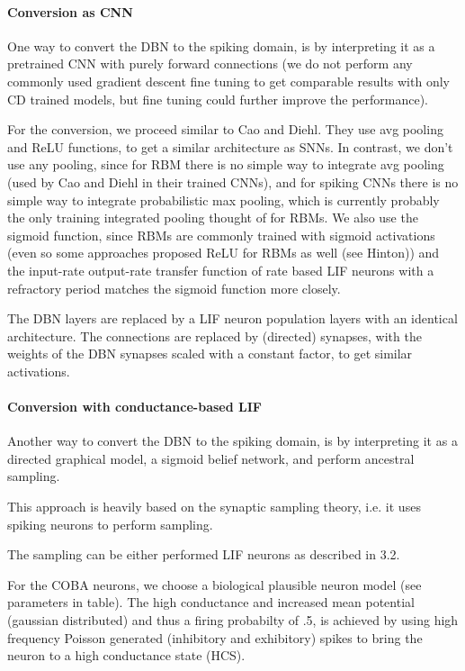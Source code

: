 \paragraph{Conversion as CNN} 

One way to convert the DBN to the spiking domain, is by interpreting it as a pretrained CNN with purely forward connections (we do not perform any commonly used gradient descent fine tuning to get comparable results with only CD trained models, but fine tuning could further improve the performance).

For the conversion, we proceed similar to Cao and Diehl.
They use avg pooling and ReLU functions, to get a similar architecture as SNNs.
In contrast, we don't use any pooling, since for RBM there is no simple way to integrate avg pooling (used by Cao and Diehl in their trained CNNs), and for spiking CNNs there is no simple way to integrate probabilistic max pooling, which is currently probably the only training integrated pooling thought of for RBMs.
We also use the sigmoid function, since RBMs are commonly trained with sigmoid activations (even so some approaches proposed ReLU for RBMs as well (see Hinton)) and the input-rate output-rate transfer function of rate based LIF neurons with a refractory period matches the sigmoid function more closely.

The DBN layers are replaced by a LIF neuron population layers with an identical architecture. 
The connections are replaced by (directed) synapses, with the weights of the DBN synapses scaled with a constant factor, to get similar activations.
 

\paragraph{Conversion with conductance-based LIF}

Another way to convert the DBN to the spiking domain, is by interpreting it as a directed graphical model, a sigmoid belief network, and perform ancestral sampling.

This approach is heavily based on the synaptic sampling theory, i.e. it uses spiking neurons to perform sampling.

The sampling can be either performed LIF neurons as described in 3.2.

For the COBA neurons, we choose a biological plausible neuron model (see parameters in table). 
The high conductance and increased mean potential (gaussian distributed) and thus a firing probabilty of .5, is achieved by using high frequency Poisson generated (inhibitory and exhibitory) spikes to bring the neuron to a high conductance state (HCS). 

